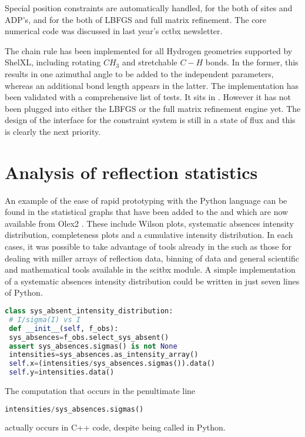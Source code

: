 \documentclass[12pt]{article}
\begin{document}
Special position constraints are automatically handled, for the both of sites and ADP's, and for the both of LBFGS and full matrix refinement. The core numerical code was discussed in last year's cctbx newsletter.

The chain rule has been implemented for all Hydrogen geometries supported by ShelXL, including rotating $CH_3$ and stretchable $C-H$ bonds. In the former, this results in one azimuthal angle to be added to the independent parameters, whereas an additional bond length appears in the latter. The implementation has been validated with a comprehensive list of tests. It sits in . However it has not been plugged into either the LBFGS or the full matrix refinement engine yet. The design of the interface for the constraint system is still in a state of flux and this is clearly the next priority.


\section{Analysis of reflection statistics}

An example of the ease of rapid prototyping with the Python language can be found in the statistical graphs that have been added to the \cctbx and which are now available from Olex2 \cite{Dolomanov:2009}. These include Wilson plots, systematic absences intensity distribution, completeness plots and a cumulative intensity distribution. In each cases, it was possible to take advantage of tools already in the \cctbx such as those for dealing with miller arrays of reflection data, binning of data and general scientific and mathematical tools available in the scitbx module.
A simple implementation of a systematic absences intensity distribution could be written in just seven lines of Python.

\begin{lstlisting}[language=Python]
class sys_absent_intensity_distribution: 
 # I/sigma(I) vs I
 def __init__(self, f_obs):
 sys_absences=f_obs.select_sys_absent()
 assert sys_absences.sigmas() is not None
 intensities=sys_absences.as_intensity_array()
 self.x=(intensities/sys_absences.sigmas()).data()
 self.y=intensities.data()
\end{lstlisting}

The computation that occurs in the penultimate line
\begin{lstlisting}[language=Python]
intensities/sys_absences.sigmas()
\end{lstlisting}
actually occurs in C++ code, despite being called in Python.
\end{document}
